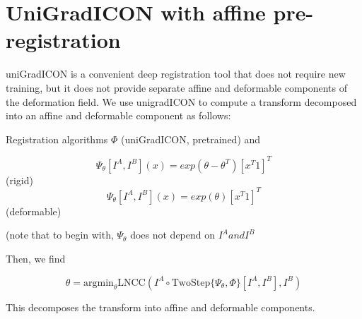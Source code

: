 \documentclass{article}
\begin{document}
\section{UniGradICON with affine pre-registration}

uniGradICON is a convenient deep registration tool that does not require new training, but it does not provide separate affine and deformable components of the deformation field. We use unigradICON to compute a transform decomposed into an affine and deformable component as follows:

Registration algorithms $\Phi$ (uniGradICON, pretrained) and 

$$\Psi_\theta[I^A, I^B](x) = exp(\theta - \theta^T)[x^T 1]^T$$ (rigid)
$$\Psi_\theta[I^A, I^B](x) = exp(\theta)[x^T 1]^T$$ (deformable)

(note that to begin with, $\Psi_\theta$ does not depend on $I^A and I^B$

Then, we find

$$ \theta = \text{argmin}_\theta \text{LNCC}(I^A \circ \text{TwoStep}\{\Psi_\theta, \Phi\}[I^A, I^B], I^B) $$

This decomposes the transform into affine and deformable components.  
\end{document}
